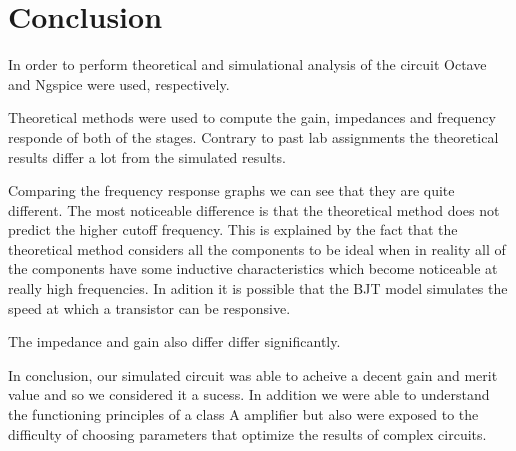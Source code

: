 
\section{Conclusion}
\label{sec:conclusion}



In order to perform theoretical and simulational analysis of the circuit Octave and Ngspice were used, respectively.


Theoretical methods were used to compute the gain, impedances and frequency responde of both of the stages. Contrary to past lab assignments the theoretical results differ a lot from the simulated results.

Comparing the frequency response graphs we can see that they are quite different. The most noticeable difference is that the theoretical method does not predict the higher cutoff frequency. This is explained by the fact that the theoretical method considers all the components to be ideal when in reality all of the components have some inductive characteristics which become noticeable at really high frequencies. In adition it is possible that the BJT model simulates the speed at which a transistor can be responsive.

The impedance and gain also differ differ significantly.

In conclusion, our simulated circuit was able to acheive a decent gain and merit value and so we considered it a sucess. In addition we were able to understand the functioning principles of a class A amplifier but also were exposed to the difficulty of choosing parameters that optimize the results of complex circuits.
